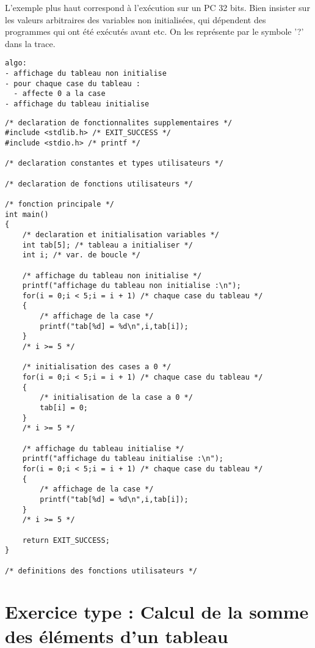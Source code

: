 \begin{correction}
L'exemple plus haut correspond à l'exécution sur un PC 32 bits. Bien insister sur les valeurs arbitraires des variables non initialisées, qui dépendent des programmes qui ont été exécutés avant etc. On les représente par le symbole '?' dans la trace.

\begin{verbatim}
algo:
- affichage du tableau non initialise
- pour chaque case du tableau :
  - affecte 0 a la case
- affichage du tableau initialise

\end{verbatim}
\begin{verbatim}
/* declaration de fonctionnalites supplementaires */
#include <stdlib.h> /* EXIT_SUCCESS */
#include <stdio.h> /* printf */

/* declaration constantes et types utilisateurs */

/* declaration de fonctions utilisateurs */

/* fonction principale */
int main()
{
    /* declaration et initialisation variables */
    int tab[5]; /* tableau a initialiser */
    int i; /* var. de boucle */

    /* affichage du tableau non initialise */
    printf("affichage du tableau non initialise :\n");
    for(i = 0;i < 5;i = i + 1) /* chaque case du tableau */
    {
        /* affichage de la case */
        printf("tab[%d] = %d\n",i,tab[i]);
    }
    /* i >= 5 */

    /* initialisation des cases a 0 */
    for(i = 0;i < 5;i = i + 1) /* chaque case du tableau */
    {
        /* initialisation de la case a 0 */
        tab[i] = 0;
    }
    /* i >= 5 */

    /* affichage du tableau initialise */
    printf("affichage du tableau initialise :\n");
    for(i = 0;i < 5;i = i + 1) /* chaque case du tableau */
    {
        /* affichage de la case */
        printf("tab[%d] = %d\n",i,tab[i]);
    }
    /* i >= 5 */

    return EXIT_SUCCESS;
}

/* definitions des fonctions utilisateurs */

\end{verbatim}
\end{correction}

\section{Exercice type : Calcul de la somme des éléments d'un tableau}

